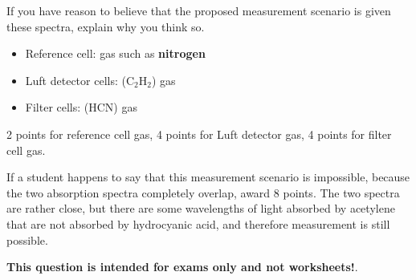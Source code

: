 \vskip 10pt

If you have reason to believe that the proposed measurement scenario is  given these spectra, explain why you think so.







\begin{itemize}
\item{} Reference cell:  gas such as {\bf nitrogen}
\vskip 5pt
\item{} Luft detector cells:  (C$_{2}$H$_{2}$) gas
\vskip 5pt
\item{} Filter cells:  (HCN) gas
\end{itemize}

2 points for reference cell gas, 4 points for Luft detector gas, 4 points for filter cell gas.

\vskip 10pt

If a student happens to say that this measurement scenario is impossible, because the two absorption spectra completely overlap, award 8 points.  The two spectra are rather close, but there are some wavelengths of light absorbed by acetylene that are not absorbed by hydrocyanic acid, and therefore measurement is still possible.







{\bf This question is intended for exams only and not worksheets!}.



